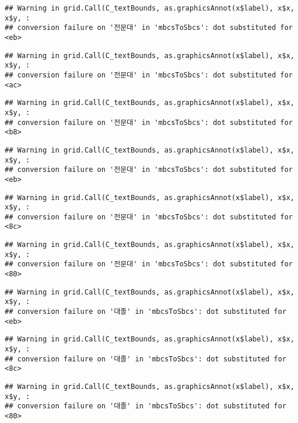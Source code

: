 \documentclass[
]{article}
\begin{document}
\begin{verbatim}
## Warning in grid.Call(C_textBounds, as.graphicsAnnot(x$label), x$x, x$y, :
## conversion failure on '전문대' in 'mbcsToSbcs': dot substituted for <eb>
\end{verbatim}

\begin{verbatim}
## Warning in grid.Call(C_textBounds, as.graphicsAnnot(x$label), x$x, x$y, :
## conversion failure on '전문대' in 'mbcsToSbcs': dot substituted for <ac>
\end{verbatim}

\begin{verbatim}
## Warning in grid.Call(C_textBounds, as.graphicsAnnot(x$label), x$x, x$y, :
## conversion failure on '전문대' in 'mbcsToSbcs': dot substituted for <b8>
\end{verbatim}

\begin{verbatim}
## Warning in grid.Call(C_textBounds, as.graphicsAnnot(x$label), x$x, x$y, :
## conversion failure on '전문대' in 'mbcsToSbcs': dot substituted for <eb>
\end{verbatim}

\begin{verbatim}
## Warning in grid.Call(C_textBounds, as.graphicsAnnot(x$label), x$x, x$y, :
## conversion failure on '전문대' in 'mbcsToSbcs': dot substituted for <8c>
\end{verbatim}

\begin{verbatim}
## Warning in grid.Call(C_textBounds, as.graphicsAnnot(x$label), x$x, x$y, :
## conversion failure on '전문대' in 'mbcsToSbcs': dot substituted for <80>
\end{verbatim}

\begin{verbatim}
## Warning in grid.Call(C_textBounds, as.graphicsAnnot(x$label), x$x, x$y, :
## conversion failure on '대졸' in 'mbcsToSbcs': dot substituted for <eb>
\end{verbatim}

\begin{verbatim}
## Warning in grid.Call(C_textBounds, as.graphicsAnnot(x$label), x$x, x$y, :
## conversion failure on '대졸' in 'mbcsToSbcs': dot substituted for <8c>
\end{verbatim}

\begin{verbatim}
## Warning in grid.Call(C_textBounds, as.graphicsAnnot(x$label), x$x, x$y, :
## conversion failure on '대졸' in 'mbcsToSbcs': dot substituted for <80>
\end{verbatim}
\end{document}
